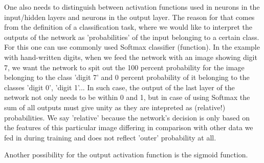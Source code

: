 One also needs to distinguish between activation functions used in neurons in the input/hidden layers and neurons in the output layer. The reason for that comes from the definition of a classification task, where we would like to interpret the outputs of the network as 'probabilities' of the input belonging to a certain class. For this one can use commonly used Softmax classifier (function). In the example with hand-written digits, when we feed the network with an image showing digit 7, we want the network to spit out the 100 percent probability for the image belonging to the class 'digit 7' and 0 percent probability of it belonging to the classes 'digit 0', 'digit 1'... In such case, the output of the last layer of the network not only needs to be within 0 and 1, but in case of using Softmax the sum of all outputs must give unity as they are intepreted as (relative!) probabilities. We say 'relative' because the network's decision is only based on the features of this particular image differing in comparison with other data we fed in during training and does not reflect 'outer' probability at all. 

Another possibility for the output activation function is the sigmoid function. 

